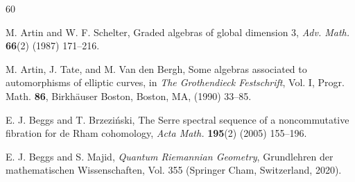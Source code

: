 \documentclass{amsart}
\theoremstyle{definition}
\theoremstyle{remark}
\numberwithin{equation}{section}
\begin{document}
\begin{thebibliography}{60}



 M. Artin and W. F. Schelter, Graded algebras of global dimension 3, {\em Adv. Math.} {\bf 66}(2) (1987) 171--216.

 M. Artin, J. Tate, and M. Van den Bergh, Some algebras associated to automorphisms of elliptic curves, in {\em The Grothendieck Festschrift}, Vol. I, Progr. Math. {\bf 86}, Birkhäuser Boston, Boston, MA, (1990) 33--85.





 E. J. Beggs and T. Brzezi{\'n}ski, The Serre spectral sequence of a noncommutative fibration for de Rham cohomology, {\em Acta Math.} {\bf 195}(2) (2005) 155--196.

 E. J. Beggs and S. Majid, {\em Quantum Riemannian Geometry}, Grundlehren der mathematischen Wissenschaften, Vol. 355 (Springer Cham,  Switzerland, 2020).




\end{thebibliography}
\end{document}
